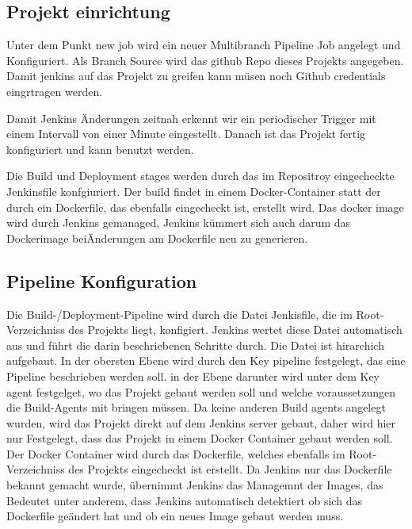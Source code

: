 \subsection{Projekt einrichtung}

Unter dem Punkt \glqq new job\grqq{} wird ein neuer Multibranch Pipeline Job angelegt und Konfiguriert. Als Branch Source wird das github Repo dieses Projekts angegeben. Damit jenkins auf das Projekt zu greifen kann müsen noch Github credentials eingrtragen werden.

Damit Jenkins Änderungen zeitnah erkennt wir ein periodischer Trigger mit einem Intervall von einer Minute eingestellt. Danach ist das Projekt fertig konfiguriert und kann benutzt werden.

Die Build und Deployment stages werden durch das im Repositroy eingecheckte Jenkinsfile konfgiuriert. Der build findet in einem Docker-Container statt der durch ein Dockerfile, das ebenfalls eingecheckt ist, erstellt wird. Das docker image wird durch Jenkins gemanaged, Jenkins kümmert sich auch darum das Dockerimage beiÄnderungen am Dockerfile neu zu generieren.

\subsection{Pipeline Konfiguration}

Die Build-/Deployment-Pipeline wird durch die Datei Jenkisfile, die im Root-Verzeichniss des Projekts liegt, konfigiert.
Jenkins wertet diese Datei automatisch aus und führt die darin beschriebenen Schritte durch. Die Datei ist hirarchich aufgebaut. In der obersten Ebene wird durch den Key \glqq pipeline\grqq{} festgelegt, das eine Pipeline beschrieben werden soll. in der Ebene darunter wird unter dem Key \glqq  agent\grqq{} festgelget, wo das Projekt gebaut werden soll und welche voraussetzungen die Build-Agents mit bringen müssen. Da keine anderen Build agents angelegt wurden, wird das Projekt direkt auf dem Jenkins server gebaut, daher wird hier nur Festgelegt, dass das Projekt in einem Docker Container gebaut werden soll. Der Docker Container wird durch das Dockerfile, welches ebenfalls im Root-Verzeichniss des Projekts eingecheckt ist erstellt. Da Jenkins nur das Dockerfile bekannt gemacht wurde, übernimmt Jenkins das Managemnt der Images, das Bedeutet unter anderem, dass Jenkins automatisch detektiert ob sich das Dockerfile geändert hat und ob ein neues Image gebaut werden muss.

